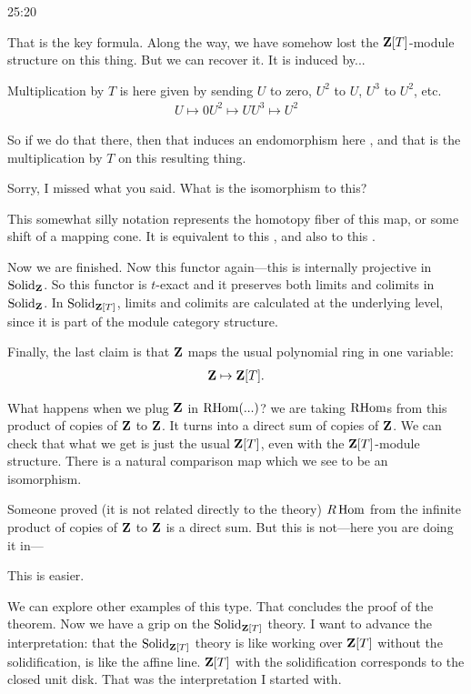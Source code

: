 \begin{unfinished}{25:20}
\begin{sketch}
That is the key formula. Along the way, we have somehow lost the $\mathbf Z[T]$-module structure on this  thing. But we can recover it. It is induced by...



\end{sketch}


Multiplication by $T$ is here given by sending $U$ to zero, $U^2$ to $U$, $U^3$ to $U^2$, etc.
\begin{align*}
U \mapsto 0
U^2 \mapsto U
U^3 \mapsto U^2
\end{align*}

So if we do that there, then that induces an endomorphism here , and that is the multiplication by $T$ on this resulting thing.

\ques Sorry, I missed what you said. What is the isomorphism to this? 

\ans This somewhat silly notation represents the homotopy fiber of this map, or some shift of a mapping cone.  It is equivalent to this , and also to this .

Now we are finished. Now this functor again---this is internally projective in $\mathrm{Solid}_\mathbf Z$. So this functor is $t$-exact and it preserves both limits and colimits in $\mathrm{Solid}_\mathbf Z$. In $\mathrm{Solid}_{\mathbf Z[T]}$, limits and colimits are calculated at the underlying level, since it is part of the module category structure.

Finally, the last claim is that $\mathbf Z$ maps the usual polynomial ring in one variable:
\begin{align*}
\mathbf Z \mapsto \mathbf Z[T].
\end{align*}

What happens when we plug $\mathbf Z$ in $\operatorname{RHom}(...)$? we are taking $\operatorname{RHom}$s from this product of copies of $\mathbf Z$ to $\mathbf Z$. It turns into a direct sum of copies of $\mathbf Z$. We can check that what we get is just the usual $\mathbf Z[T]$, even with the $\mathbf Z[T]$-module structure. There is a natural comparison map which we see to be an isomorphism.

\ques Someone proved (it is not related directly to the theory) $R\operatorname{Hom}$ from the infinite product of copies of $\mathbf Z$ to $\mathbf Z$ is a direct sum. But this is not---here you are doing it in---

\ans This is easier.

We can explore other examples of this type. That concludes the proof of the theorem. Now we have a grip on the $\mathrm{Solid}_{\mathbf Z[T]}$ theory. 
I want to advance the interpretation: that the $\mathrm{Solid}_{\mathbf Z[T]}$ theory is like working over $\mathbf Z[T]$ without the solidification, is like the affine line. $\mathbf Z[T]$ with the solidification corresponds to the closed unit disk. That was the interpretation I started with.


\end{unfinished}
